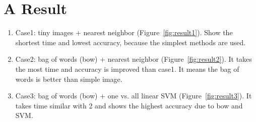 \section*{A Result}

\begin{enumerate}
    \item Case1: tiny images + nearest neighbor (Figure~\ref{fig:result1}). Show the shortest time and lowest accuracy, because the simplest methods are used.
    \item Case2: bag of words (bow) + nearest neighbor (Figure~\ref{fig:result2}). It takes the most time and accuracy is improved than case1. It means the bag of words is better than simple image. 
    \item Case3: bag of words (bow) + one vs. all linear SVM (Figure~\ref{fig:result3}). It takes time similar with 2 and shows the highest accuracy due to bow and SVM. 
\end{enumerate}

